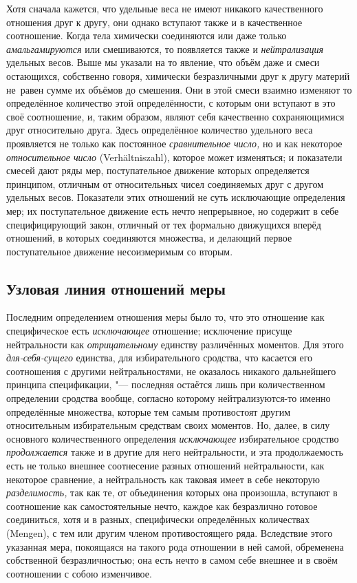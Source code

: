 Хотя сначала кажется, что удельные веса не имеют никакого качественного
отношения друг к другу, они однако вступают также и в качественное соотношение.
Когда тела химически соединяются или даже только {\em амальгамируются} или
смешиваются, то появляется также и {\em нейтрализация} удельных весов. Выше
мы указали на то явление, что объём даже и смеси остающихся, собственно говоря,
химически безразличными друг к другу материй не~равен сумме их объёмов до
смешения. Они в этой смеси взаимно изменяют то определённое количество этой
определённости, с которым они вступают в это своё соотношение, и, таким
образом, являют себя качественно сохраняющимися друг относительно друга. Здесь
определённое количество удельного веса проявляется не только как постоянное
{\em сравнительное число,} но и как некоторое {\em относительное число}
(Ver\-hält\-nis\-zahl), которое может изменяться; и показатели смесей дают ряды
мер, поступательное движение которых определяется принципом, отличным от
относительных чисел соединяемых друг с другом удельных весов. Показатели
этих отношений не суть исключающие определения мер; их поступательное движение
есть нечто непрерывное, но содержит в себе специфицирующий закон, отличный от
тех формально движущихся вперёд отношений, в которых соединяются множества, и
делающий первое поступательное движение несоизмеримым со вторым.

\subsection{Узловая линия отношений меры}

Последним определением отношения меры было то, что это отношение как специфическое есть
{\em исключающее} отношение; исключение присуще нейтральности как {\em отрицательному}
единству различённых моментов. Для этого {\em для-себя-сущего} единства, для
избирательного сродства, что касается его соотношения с другими
нейтральностями, не оказалось никакого дальнейшего принципа спецификации, "---
последняя остаётся лишь при количественном определении сродства вообще,
согласно которому нейтрализуются-то именно определённые множества, которые тем
самым противостоят другим относительным избирательным средствам своих моментов.
Но, далее, в силу основного количественного определения {\em исключающее}
избирательное сродство {\em продолжается} также и в другие для него
нейтральности, и эта продолжаемость есть не только внешнее соотнесение разных
отношений нейтральности, как некоторое сравнение, а нейтральность как таковая
имеет в себе некоторую {\em разделимость,} так как те, от объединения которых
она произошла, вступают в соотношение как самостоятельные нечто, каждое как
безразлично готовое соединиться, хотя и в разных, специфически определённых
количествах (Mengen), с тем или другим членом противостоящего ряда. Вследствие этого
указанная мера, покоящаяся на такого рода отношении в ней самой, обременена
собственной безразличностью; она есть нечто в самом себе внешнее и в своём
соотношении с собою изменчивое.

